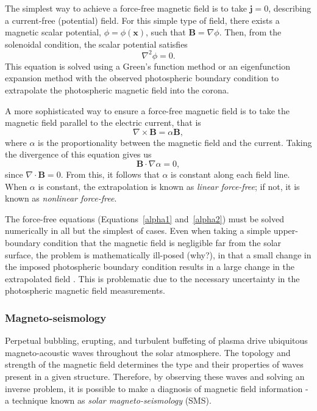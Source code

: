 \documentclass[12pt]{../style-files/ociamthesis}
\begin{document}
The simplest way to achieve a force-free magnetic field is to take $\mathbf{j} = 0$, describing a current-free (potential) field. For this simple type of field, there exists a magnetic scalar potential, $\phi = \phi(\mathbf{x})$, such that $\mathbf{B} = \nabla\phi$. Then, from the solenoidal condition, the scalar potential satisfies
\begin{equation}
\nabla^2 \phi = 0.
\end{equation}
This equation is solved using a Green's function method or an eigenfunction expansion method with the observed photospheric boundary condition to extrapolate the photospheric magnetic field into the corona.

A more sophisticated way to ensure a force-free magnetic field is to take the magnetic field parallel to the electric current, that is
\begin{equation}
\nabla \times \mathbf{B} = \alpha \mathbf{B},
\label{alpha1}
\end{equation}
where $\alpha$ is the proportionality between the magnetic field and the current. Taking the divergence of this equation gives us
\begin{equation}
\mathbf{B} \cdot \nabla\alpha = 0,
\label{alpha2}
\end{equation}
since $\nabla \cdot \mathbf{B} = 0$. From this, it follows that $\alpha$ is constant along each field line. When $\alpha$ is constant, the extrapolation is known as \textit{linear force-free}; if not, it is known as \textit{nonlinear force-free}.

The force-free equations (Equations~\eqref{alpha1} and~\eqref{alpha2}) must be solved numerically in all but the simplest of cases. Even when taking a simple upper-boundary condition that the magnetic field is negligible far from the solar surface, the problem is mathematically ill-posed (why?), in that a small change in the imposed photospheric boundary condition results in a large change in the extrapolated field \citep{low_etal90}. This is problematic due to the necessary uncertainty in the photospheric magnetic field measurements.


\subsubsection{Magneto-seismology}
Perpetual bubbling, erupting, and turbulent buffeting of plasma drive ubiquitous magneto-acoustic waves throughout the solar atmosphere. The topology and strength of the magnetic field determines the type  and their properties of waves present in a given structure. Therefore, by observing these waves and solving an inverse problem, it is possible to make a diagnosis of magnetic field information - a technique known as \textit{solar magneto-seismology} (SMS).
\end{document}
